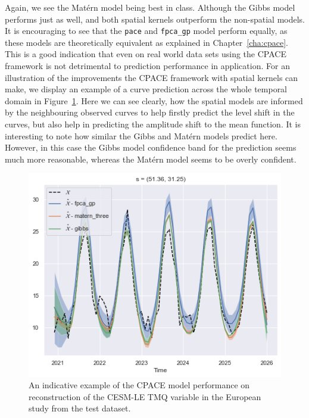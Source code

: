 Again, we see the Mat\'ern model being best in class.
Although the Gibbs model performs just as well, and both spatial kernels outperform the non-spatial models.
It is encouraging to see that the \verb*|pace| and \verb*|fpca_gp| model perform equally, as these models are theoretically equivalent as explained in Chapter~\ref{cha:cpace}.
This is a good indication that even on real world data sets using the CPACE framework is not detrimental to prediction performance in application.
For an illustration of the improvements the CPACE framework with spatial kernels can make, we display an example of a curve prediction across the whole temporal domain in Figure~\ref{fig:test_ex_tmq_eur}.
Here we can see clearly, how the spatial models are informed by the neighbouring observed curves to help firstly predict the level shift in the curves, but also help in predicting the amplitude shift to the mean function.
It is interesting to note how similar the Gibbs and Mat\'ern models predict here.
However, in this case the Gibbs model confidence band for the prediction seems much more reasonable, whereas the Mat\'ern model seems to be overly confident.

\begin{figure}
	\centering
	\includegraphics[width=\textwidth]{test_ex_tmq_eur}
	\caption{An indicative example of the CPACE model performance on reconstruction of the CESM-LE TMQ variable in the European study from the test dataset.}
	\label{fig:test_ex_tmq_eur}
\end{figure}

